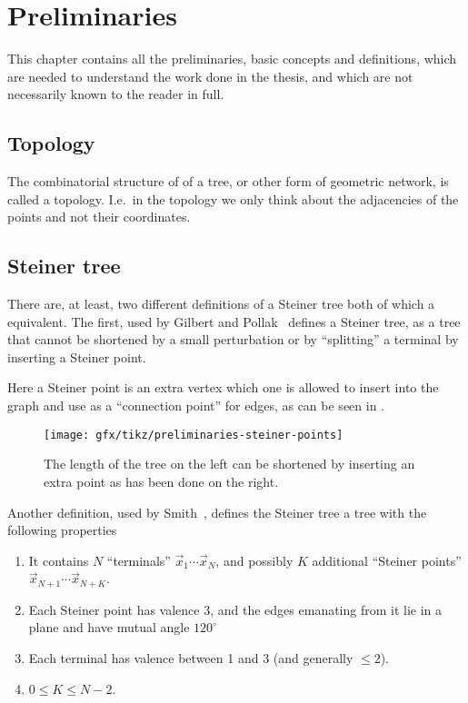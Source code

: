 {
\abnormalparskip{0pt}
\chapter{Preliminaries}
\label{cha:preliminaries}
}

This chapter contains all the preliminaries, basic concepts and definitions,
which are needed to understand the work done in the thesis, and which are
not necessarily known to the reader in full.


\section{Topology}
\label{sec:topology}

The combinatorial structure of of a tree, or other form of geometric network, is
called a topology.  I.e.\ in the topology we only think about the adjacencies of
the points and not their coordinates.

\section{Steiner tree}
\label{sec:steiner-tree}

There are, at least, two different definitions of a Steiner tree both of which a
equivalent.  The first, used by Gilbert and Pollak~\cite{Gilbert1968} defines a
Steiner tree, as a tree that cannot be shortened by a small perturbation or by
``splitting'' a terminal by inserting a Steiner point.

Here a Steiner point is an extra vertex which one is allowed to insert into the
graph and use as a ``connection point'' for edges, as can be seen in
.

\begin{figure}[htbp]
\centering
\texttt{[image: gfx/tikz/preliminaries-steiner-points]}
\caption[Steiner point of isosceles triangle.]{The length of the tree on the left
  can be shortened by inserting an extra point as has been done on the
  right.\label{fig:preliminaries-steiner-point}}
\end{figure}

Another definition, used by Smith~\cite{Smith1992}, defines the Steiner tree a
tree with the following properties

\begin{enumerate}
\item It contains $N$ ``terminals'' $\vec{x}_1 \cdots \vec{x}_N$, and
  possibly $K$ additional ``Steiner points'' $\vec{x}_{N+1} \cdots
  \vec{x}_{N+K}$.
\item Each Steiner point has valence 3, and the edges emanating from it lie in a
  plane and have mutual angle $120^{\circ}$
\item Each terminal has valence between 1 and 3 (and generally $\le 2$).
\item $0 \le K \le N-2$.
\end{enumerate}

